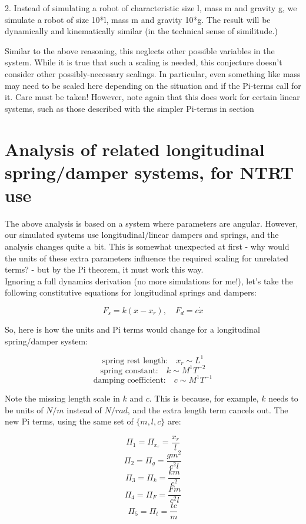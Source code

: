 \documentclass[12pt,letterpaper]{article}
\begin{document}
2. Instead of simulating a robot of characteristic size l, mass m and gravity g, we simulate a robot of size 10*l, mass m and gravity 10*g.
The result will be dynamically and kinematically similar (in the technical sense of similitude.)

Similar to the above reasoning, this neglects other possible variables in the system. 
While it is true that such a scaling is needed, this conjecture doesn't consider other possibly-necessary scalings.
In particular, even something like mass may need to be scaled here depending on the situation and if the Pi-terms call for it.
Care must be taken!
However, note again that this does work for certain linear systems, such as those described with the simpler Pi-terms in section 

\section{Analysis of related longitudinal spring/damper systems, for NTRT use}

The above analysis is based on a system where parameters are angular.
However, our simulated systems use longitudinal/linear dampers and springs, and the analysis changes quite a bit.
This is somewhat unexpected at first - why would the units of these extra parameters influence the required scaling for unrelated terms? - but by the Pi theorem, it must work this way. \\

Ignoring a full dynamics derivation (no more simulations for me!), let's take the following constitutive equations for longitudinal springs and dampers:

\[
F_s = k(x - x_r), \quad F_d = c \dot x
\]

So, here is how the units and Pi terms would change for a longitudinal spring/damper system:

\[
\text{spring rest length:} \quad x_r \sim L^1
\]
\[
\text{spring constant:} \quad k \sim M^1 T^{-2}
\]
\[
\text{damping coefficient:} \quad c \sim M^1 T^{-1}
\]

Note the missing length scale in $k$ and $c$. 
This is because, for example, $k$ needs to be units of $N/m$ instead of $N/rad$, and the extra length term cancels out.
The new Pi terms, using the same set of $\{m,l,c\}$ are:

\[
\Pi_1 = \Pi_{x_r} = \frac{x_r}{l}
\]
\[
\Pi_2 = \Pi_{g} = \frac{gm^2}{c^2l}
\]
\[
\Pi_3 = \Pi_{k} = \frac{km}{c^2}
\]
\[
\Pi_4 = \Pi_{F} = \frac{Fm}{c^2l}
\]
\[
\Pi_5 = \Pi_{t} = \frac{tc}{m}
\]
\end{document}

